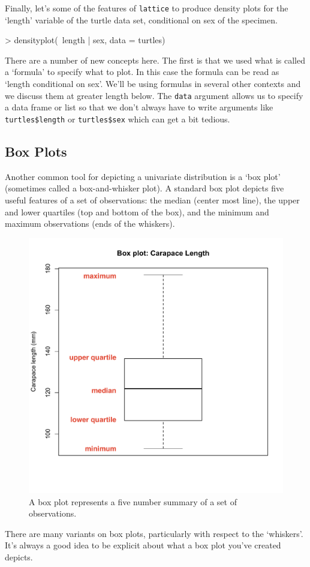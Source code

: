 Finally, let's some of the features of \lstinline!lattice! to produce
density plots for the `length' variable of the turtle data set,
conditional on sex of the specimen.

\begin{R}
> densityplot(~length | sex, data = turtles)
\end{R}
There are a number of new concepts here. The first is that we used what
is called a `formula' to specify what to plot. In this case the formula
can be read as `length conditional on sex'. We'll be using formulas in
several other contexts and we discuss them at greater length below. The
\lstinline!data! argument allows us to specify a data frame or list so
that we don't always have to write arguments like
\lstinline!turtles$length! or \lstinline!turtles$sex! which can get a
bit tedious.

\subsection{Box Plots}

Another common tool for depicting a univariate distribution is a `box
plot' (sometimes called a box-and-whisker plot). A standard box plot
depicts five useful features of a set of observations: the median
(center most line), the upper and lower quartiles (top and bottom of the
box), and the minimum and maximum observations (ends of the whiskers).

\begin{figure}[htbp]
\centering
\includegraphics[width=0.5\columnwidth]{./figures/hands-on1/boxplot-labeled.pdf}
\caption{A box plot represents a five number summary of a set of
observations.}
\end{figure}

There are many variants on box plots, particularly with respect to the
`whiskers'. It's always a good idea to be explicit about what a box plot
you've created depicts.

